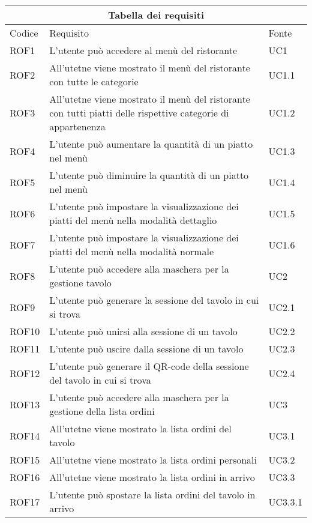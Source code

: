 \begin{center}
    \renewcommand{\arraystretch}{1.5}
    \begin{longtable}{ |p{1.5cm}|p{9cm}|p{1.5cm}|  }
        \hline
        \multicolumn{3}{|c|}{Tabella dei requisiti} \\
        \hline
        Codice&Requisito &Fonte \\
        \hline
        \endhead
        ROF1&L'utente può accedere al menù del ristorante&UC1 \\
        ROF2&All'utetne viene mostrato il menù del ristorante con tutte le categorie&UC1.1 \\
        ROF3&All'utetne viene mostrato il menù del ristorante con tutti piatti delle rispettive categorie di appartenenza&UC1.2 \\
        ROF4&L'utente può aumentare la quantità di un piatto nel menù&UC1.3 \\
        ROF5&L'utente può diminuire la quantità di un piatto nel menù&UC1.4 \\
        ROF6&L'utente può impostare la visualizzazione dei piatti del menù nella modalità dettaglio&UC1.5 \\
        ROF7&L'utente può impostare la visualizzazione dei piatti del menù nella modalità normale&UC1.6 \\
        ROF8&L'utente può accedere alla maschera per la gestione tavolo &UC2 \\
        ROF9&L'utente può generare la sessione del tavolo in cui si trova&UC2.1\\
        ROF10&L'utente può unirsi alla sessione di un tavolo&UC2.2 \\
        ROF11&L'utente può uscire dalla sessione di un tavolo&UC2.3\\
        ROF12&L'utente può generare il QR-code della sessione del tavolo in cui si trova&UC2.4\\
        ROF13&L'utente può accedere alla maschera per la gestione della lista ordini&UC3 \\
        ROF14&All'utetne viene mostrato la lista ordini del tavolo&UC3.1 \\
        ROF15&All'utetne viene mostrato la lista ordini personali &UC3.2 \\
        ROF16&All'utetne viene mostrato la lista ordini in arrivo&UC3.3 \\
        ROF17&L'utente può spostare la lista ordini del tavolo in arrivo &UC3.3.1 \\

\end{longtable}
\end{center}
